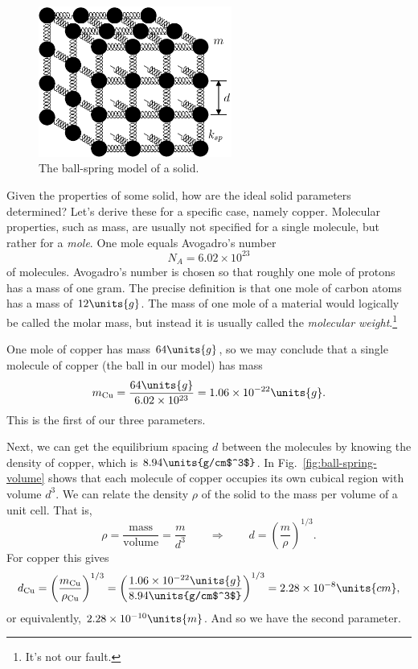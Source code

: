 \begin{figure}
\begin{center}
\includegraphics[width=2.5in]{thermal_energy_and_solids/ball-spring.eps}
\caption{The ball-spring model of a solid.}
\label{fig:ball-spring}
\end{center}
\end{figure}

Given the properties of some solid, how are the ideal solid
parameters determined?  Let's derive these for a specific case, namely
copper.  Molecular properties, such as mass, are usually not specified
for a single molecule, but rather for a {\it mole}.  One mole equals
Avogadro's number
\begin{equation}
N_A=6.02\times 10^{23}
\end{equation} 
of molecules.  Avogadro's number is chosen so that roughly one mole of
protons has a mass of one gram.  The precise definition is that one
mole of carbon atoms has a mass of $12\units{g}$.  The mass of one mole
of a material would logically be called the molar mass, but instead it
is usually called the {\it molecular weight}.\footnote{It's not our fault.}

One mole of copper has mass $64\units{g}$, so we may conclude that a
single molecule of copper (the ball in our model) has mass
\begin{equation}
m_\text{Cu} = \frac{64\units{g}}{6.02\times 10^{23}} = 1.06\times
10^{-22}\units{g}.
\end{equation}
This is the first of our three parameters.

Next, we can get the equilibrium spacing $d$ between the molecules by
knowing the density of copper, which is $8.94\units{g/cm$^3$}$.  
In Fig.~\ref{fig:ball-spring-volume} shows that each molecule of copper
occupies its own cubical region with volume $d^3$.
We can relate the density $\rho$ of the solid to the mass per volume
of a unit cell.  That is,
\begin{equation}
\rho = \frac{\text{mass}}{\text{volume}} = \frac{m}{d^3} 
  \qquad \Rightarrow\qquad d =
\left(\frac{m}{\rho}\right)^{1/3}.
\end{equation}
For copper this gives
\begin{equation}
d_\text{Cu} = \left(\frac{m_\text{Cu}}{\rho_\text{Cu}}\right)^{1/3}
 =  \left(\frac{1.06\times
     10^{-22}\units{g}}{8.94\units{g/cm$^3$}}\right)^{1/3}
 = 2.28\times 10^{-8}\units{cm},
\end{equation}
or equivalently, $2.28\times 10^{-10}\units{m}$.
And so we have the second parameter.

